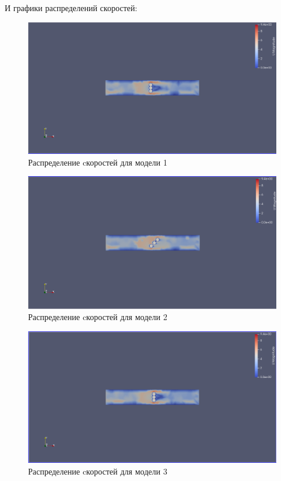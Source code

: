 \documentclass[a4paper,12pt]{article}
\theoremstyle{plain} %
\theoremstyle{definition} %
\theoremstyle{remark} %
\begin{document}
\par
И графики распределений скоростей:
\begin{figure}[h]
	\begin{center}
		\includegraphics[width=0.4\linewidth]{8.1.png}
		\caption{Распределение cкоростей для модели 1} %
	\end{center}
\end{figure}

\begin{figure}[h]
	\begin{center}
		\includegraphics[width=0.4\linewidth]{8.2.png}
		\caption{Распределение cкоростей для модели 2} %
	\end{center}
\end{figure}

\begin{figure}[h]
	\begin{center}
		\includegraphics[width=0.4\linewidth]{8.3.png}
		\caption{Распределение cкоростей для модели 3} %
	\end{center}
\end{figure}

\newpage
\end{document}
